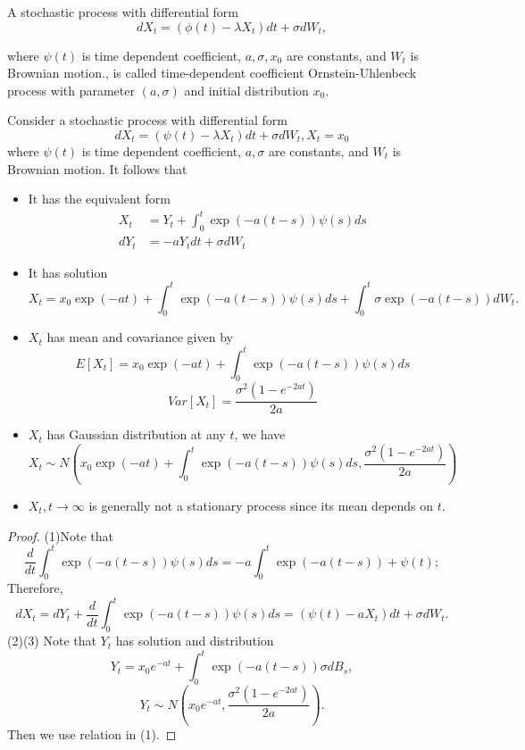 \begin{refsection}
\begin{definition}
	A stochastic process with differential form 
	$$dX_t = (\phi(t) - \lambda X_t) dt + \sigma dW_t,$$
	
	where $\psi(t)$ is time dependent coefficient, $a, \sigma,x_0$ are constants, and $W_t$ is Brownian motion.,
	is called time-dependent coefficient Ornstein-Uhlenbeck process with parameter $(a,\sigma)$ and initial distribution $x_0$.
\end{definition}

\begin{lemma}
	Consider a stochastic process with differential form 
	$$dX_t = (\psi(t) - \lambda X_t) dt + \sigma dW_t, X_t = x_0$$
	where $\psi(t)$ is time dependent coefficient, $a, \sigma$ are constants, and $W_t$ is Brownian motion.
	It follows that
	\begin{itemize}
		\item It has the equivalent form 
		\begin{align*}
		X_t &= Y_t + \int_0^t \exp(-a(t-s))\psi(s)ds \\
		dY_t &= -a Y_t dt + \sigma dW_t
		\end{align*}
		\item It has solution
		$$X_t = x_0\exp(-at) + \int_0^t \exp(-a(t-s))\psi(s)ds  + \int_0^t \sigma \exp(-a(t-s)) dW_t.$$
		\item $X_t$ has mean and covariance given by
		$$E[X_t] =x_0\exp(-at) + \int_0^t \exp(-a(t-s))\psi(s)ds $$
		$$Var[X_t] = \frac{\sigma^2(1- e^{-2at})}{2a}$$
		\item $X_t$ has Gaussian distribution at any $t$, we have
		$$X_t\sim N(x_0\exp(-at) + \int_0^t \exp(-a(t-s))\psi(s)ds,\frac{\sigma^2(1- e^{-2at})}{2a})$$
		\item $X_t, t\to\infty$ is generally not a stationary process since its mean depends on $t$.
		
	\end{itemize}
	
\end{lemma}
\begin{proof}
	(1)Note that
	$$\frac{d}{dt}\int_0^t \exp(-a(t-s))\psi(s)ds = -a\int_0^t \exp(-a(t-s)) + \psi(t);$$
	Therefore,
	$$dX_t = dY_t + \frac{d}{dt}\int_0^t \exp(-a(t-s))\psi(s)ds = (\psi(t) - aX_t)dt + \sigma dW_t.$$
	(2)(3)
	Note that $Y_t$ has solution and distribution
	$$Y_t = x_0 e^{-at} + \int_0^t \exp(-a(t-s))\sigma dB_s,$$
	$$Y_t \sim N(x_0 e^{-at}, \frac{\sigma^2(1- e^{-2at})}{2a}).$$
	Then we use relation in (1).
\end{proof}



\end{refsection}

